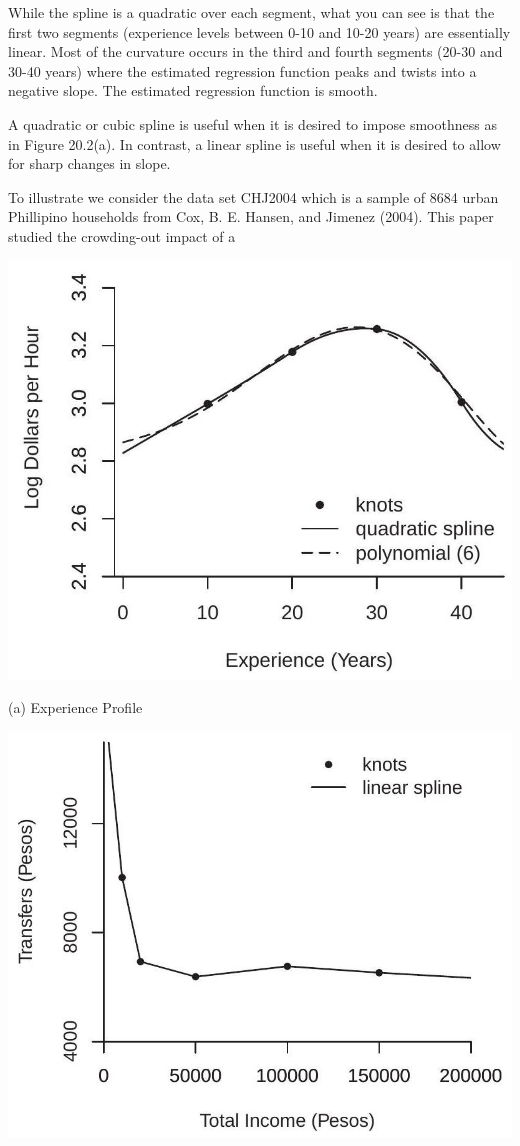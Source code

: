 \documentclass[10pt]{article}
\begin{document}
While the spline is a quadratic over each segment, what you can see is that the first two segments (experience levels between 0-10 and 10-20 years) are essentially linear. Most of the curvature occurs in the third and fourth segments (20-30 and 30-40 years) where the estimated regression function peaks and twists into a negative slope. The estimated regression function is smooth.

A quadratic or cubic spline is useful when it is desired to impose smoothness as in Figure 20.2(a). In contrast, a linear spline is useful when it is desired to allow for sharp changes in slope.

To illustrate we consider the data set CHJ2004 which is a sample of 8684 urban Phillipino households from Cox, B. E. Hansen, and Jimenez (2004). This paper studied the crowding-out impact of a

\includegraphics[max width=\textwidth]{2022_10_23_2b38d6d54e7725c196e7g-07}

(a) Experience Profile

\includegraphics[max width=\textwidth]{2022_10_23_2b38d6d54e7725c196e7g-07(1)}
\end{document}
